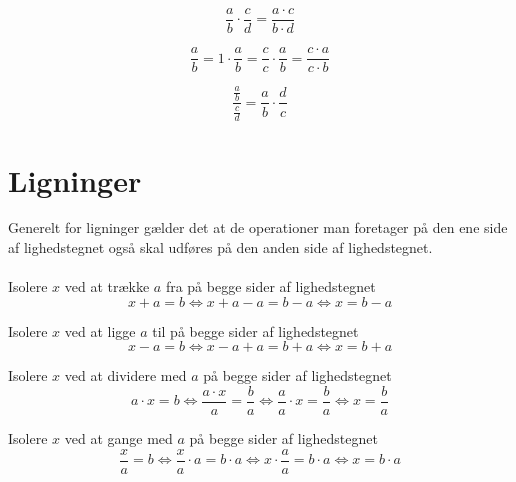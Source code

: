 \documentclass[11pt,a5paper,fleqn,leqno]{book}
\begin{document}
\begin{equation} \label{eq:broeker_ganget_sammen}
\frac{a}{b} \cdot \frac{c}{d} = \frac{a \cdot c}{b \cdot d}
\end{equation}

\begin{equation} \label{eq:forlaenge_en_broek}
\frac{a}{b} = 1 \cdot \frac{a}{b} = \frac{c}{c} \cdot \frac{a}{b} = \frac{c \cdot a}{c \cdot b}
\end{equation}

\begin{equation} \label{eq:broeker_divideret}
\frac{\frac{a}{b}}{\frac{c}{d}} = \frac{a}{b} \cdot \frac{d}{c}
\end{equation}

\newpage

\section{Ligninger}

Generelt for ligninger gælder det at de operationer man foretager på den ene side af lighedstegnet også skal udføres på den anden side af lighedstegnet.
\\
\\
Isolere $x$ ved at trække $a$ fra på begge sider af lighedstegnet
\begin{equation} \label{eq:ligning_minus}
x + a = b \Leftrightarrow x + a - a = b - a \Leftrightarrow x = b - a
\end{equation}

Isolere $x$ ved at ligge $a$ til på begge sider af lighedstegnet
\begin{equation} \label{eq:ligning_plus}
x - a = b \Leftrightarrow x - a + a = b + a \Leftrightarrow x = b + a
\end{equation}

Isolere $x$ ved at dividere med $a$ på begge sider af lighedstegnet
\begin{equation} \label{eq:ligning_dividere}
a \cdot x = b \Leftrightarrow \frac{a \cdot x}{a} = \frac{b}{a} \Leftrightarrow \frac{a}{a} \cdot x = \frac{b}{a} \Leftrightarrow x = \frac{b}{a}
\end{equation}

Isolere $x$ ved at gange med $a$ på begge sider af lighedstegnet
\begin{equation} \label{eq:ligning_gange}
\frac{x}{a} = b \Leftrightarrow \frac{x}{a} \cdot a = b \cdot a \Leftrightarrow x \cdot \frac{a}{a} = b \cdot a \Leftrightarrow x = b \cdot a
\end{equation}
\end{document}

